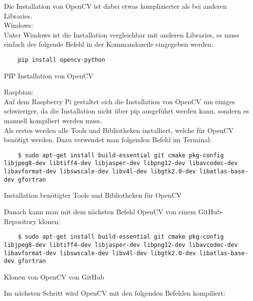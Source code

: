 Die Installation von OpenCV ist dabei etwas komplizierter als bei anderen Libraries.\\

Windows:\\

Unter Windows ist die Installation vergleichbar mit anderen Libraries, es muss einfach der folgende Befehl in der Kommandozeile eingegeben werden:

\begin{listing}[H]
    \begin{verbatim}
    pip install opencv-python
    \end{verbatim}
    \caption{PIP Installation von OpenCV}
\end{listing}

Raspbian:\\

Auf dem Raspberry Pi gestaltet sich die Installation von OpenCV um einiges schwieriger, da die Installation nicht über pip ausgeführt werden kann, 
sondern es manuell kompiliert werden muss.\\

Als erstes werden alle Tools und Bibliotheken installiert, welche für OpenCV benötigt werden. Dazu verwendet man folgenden Befehl im Terminal:

\begin{listing}[H]
    \begin{verbatim}
    $ sudo apt-get install build-essential git cmake pkg-config libjpeg8-dev libtiff4-dev libjasper-dev libpng12-dev libavcodec-dev libavformat-dev libswscale-dev libv4l-dev libgtk2.0-dev libatlas-base-dev gfortran
    \end{verbatim}
    \caption{Installation benötigter Tools und Bibliotheken für OpenCV}
\end{listing}

Danach kann man mit dem nächsten Befehl OpenCV von einem GitHub-Repository klonen:

\begin{listing}[H]
    \begin{verbatim}
    $ sudo apt-get install build-essential git cmake pkg-config libjpeg8-dev libtiff4-dev libjasper-dev libpng12-dev libavcodec-dev libavformat-dev libswscale-dev libv4l-dev libgtk2.0-dev libatlas-base-dev gfortran
    \end{verbatim}
    \caption{Klonen von OpenCV von GitHub}
\end{listing}

Im nächsten Schritt wird OpenCV mit den folgenden Befehlen kompiliert:


